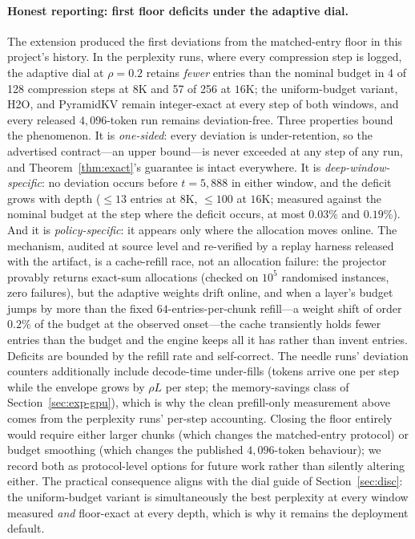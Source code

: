 \paragraph{Honest reporting: first floor deficits under the adaptive
dial.}
The extension produced the first deviations from the matched-entry
floor in this project's history. In the perplexity runs, where every
compression step is logged, the adaptive \sage{} dial at $\rho=0.2$
retains \emph{fewer} entries than the nominal budget in 4 of 128
compression steps at $8$K and 57 of 256 at $16$K; the uniform-budget
variant, H2O, and PyramidKV remain integer-exact at every step of both
windows, and every released $4{,}096$-token run remains
deviation-free. Three properties bound the phenomenon. It is
\emph{one-sided}: every deviation is under-retention, so the advertised
contract---an upper bound---is never exceeded at any step of any run,
and Theorem~\ref{thm:exact}'s guarantee is intact everywhere. It is
\emph{deep-window-specific}: no deviation occurs before
$t=5{,}888$ in either window, and the deficit grows with depth
($\le 13$ entries at $8$K, $\le 100$ at $16$K; measured against the
nominal budget at the step where the deficit occurs, at most $0.03\%$
and $0.19\%$). And it is \emph{policy-specific}:
it appears only where the allocation moves online. The mechanism, audited
at source level and re-verified by a replay harness released with the
artifact, is a cache-refill race, not an allocation failure: the
projector provably returns exact-sum allocations (checked on $10^5$
randomised instances, zero failures), but the adaptive weights drift
online, and when a layer's budget jumps by more than the fixed
$64$-entries-per-chunk refill---a weight shift of order $0.2\%$ of the
budget at the observed onset---the cache transiently holds
fewer entries than the budget and the engine keeps all it has rather
than invent entries. Deficits are bounded by the refill rate and
self-correct. The needle runs' deviation counters additionally include
decode-time under-fills (tokens arrive one per step while the envelope
grows by $\rho L$ per step; the memory-savings class of
Section~\ref{sec:exp-gpu}), which is why the clean prefill-only
measurement above comes from the perplexity runs' per-step accounting.
Closing the floor entirely would require either larger chunks (which
changes the matched-entry protocol) or budget smoothing (which changes
the published $4{,}096$-token behaviour); we record both as
protocol-level options for future work rather than silently altering
either. The practical consequence aligns with the dial guide of
Section~\ref{sec:disc}: the uniform-budget variant is simultaneously
the best perplexity at every window measured \emph{and} floor-exact at
every depth, which is why it remains the deployment default.
